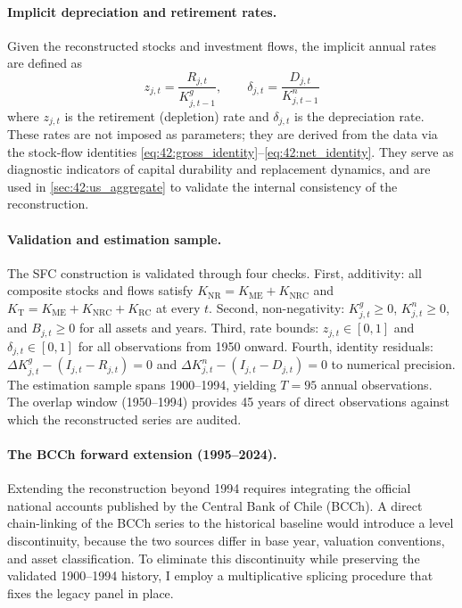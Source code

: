 \paragraph{Implicit depreciation and retirement rates.}
Given the reconstructed stocks and investment flows, the implicit
annual rates are defined as
\begin{equation}
	z_{j,t} = \frac{R_{j,t}}{K^{g}_{j,t-1}},
	\qquad
	\delta_{j,t} = \frac{D_{j,t}}{K^{n}_{j,t-1}}
	\label{eq:42:implicit_rates}
\end{equation}
where $z_{j,t}$ is the retirement (depletion) rate and
$\delta_{j,t}$ is the depreciation rate. These rates are not
imposed as parameters; they are derived from the data via the
stock-flow identities
\eqref{eq:42:gross_identity}--\eqref{eq:42:net_identity}. They
serve as diagnostic indicators of capital durability and
replacement dynamics, and are used in
\cref{sec:42:us_aggregate} to validate the internal consistency of
the reconstruction.

\paragraph{Validation and estimation sample.}
The SFC construction is validated through four checks. First,
additivity: all composite stocks and flows satisfy
$K_{\text{NR}} = K_{\text{ME}} + K_{\text{NRC}}$ and
$K_{\text{T}} = K_{\text{ME}} + K_{\text{NRC}} + K_{\text{RC}}$
at every $t$. Second, non-negativity: $K^{g}_{j,t} \geq 0$,
$K^{n}_{j,t} \geq 0$, and $B_{j,t} \geq 0$ for all assets and
years. Third, rate bounds: $z_{j,t} \in [0,1]$ and
$\delta_{j,t} \in [0,1]$ for all observations from 1950 onward.
Fourth, identity residuals: $\Delta K^{g}_{j,t} - (I_{j,t} -
R_{j,t}) = 0$ and $\Delta K^{n}_{j,t} - (I_{j,t} - D_{j,t}) = 0$
to numerical precision. The estimation sample spans 1900--1994,
yielding $T = 95$ annual observations. The overlap window
(1950--1994) provides 45 years of direct \citet{Hofman2000b}
observations against which the reconstructed series are audited.

\paragraph{The BCCh forward extension (1995--2024).}
Extending the reconstruction beyond 1994 requires integrating the
official national accounts published by the Central Bank of Chile
(BCCh). A direct chain-linking of the BCCh series to the historical
baseline would introduce a level discontinuity, because the two
sources differ in base year, valuation conventions, and asset
classification. To eliminate this discontinuity while preserving the
validated 1900--1994 history, I employ a multiplicative splicing
procedure that fixes the legacy panel in place.

